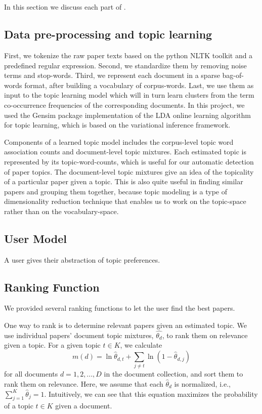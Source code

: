 \section{\system}

In this section we discuss each part of \system.

\subsection{Data pre-processing and topic learning}
First, we tokenize the raw paper texts based on the python NLTK toolkit and a
predefined regular expression. Second, we standardize them by removing noise terms
and stop-words. Third, we represent each document in a sparse 
bag-of-words format, after building a vocabulary of
corpus-words. Last, we use them as input to the topic learning model which will
in turn learn clusters from the term co-occurrence frequencies of the corresponding
documents. In this project, we used the Gensim 
package implementation of the LDA online learning algorithm 
\cite{rehurek_lrec, hoffman2010online} for topic learning, which is 
based on the variational inference framework.    

Components of a learned topic model includes the corpus-level topic word association counts
and document-level topic mixtures. Each estimated topic is represented
by its topic-word-counts, which is useful for our automatic detection of paper topics. 
The document-level topic mixtures give an idea of the topicality of a
particular paper given a topic. This is also quite useful in finding similar papers and
grouping them together, because topic modeling is a type of dimensionality reduction
technique that enables us to work on the topic-space rather than on 
the vocabulary-space.




\subsection{User Model}
A user gives their abstraction of topic preferences.


\subsection{Ranking Function}
We provided several ranking functions to let the user find
the best papers.

One way to rank is to determine relevant papers 
given an estimated topic. We use individual papers'
document topic mixtures, $\hat{\theta_d}$, to rank them 
on relevance given a topic. For a given 
topic $t \in K$, we calculate
\begin{equation}
m(d) = \ln \hat{\theta}_{d,t} + \sum_{j \neq t}{\ln (1 - \hat{\theta}_{d,j})}
\end{equation}
for all documents $d = 1, 2, ..., D$ in 
the document collection, and sort them to rank
them on relevance. Here, we assume that
each $\hat{\theta}_d$ is normalized, 
i.e., $\sum_{j=1}^{K}{\hat{\theta}_j} = 1$.
Intuitively, we can see that this equation maximizes the probability
of a topic $t \in K$ given a document.





